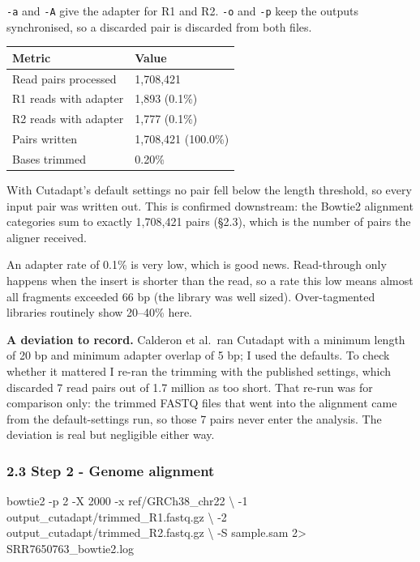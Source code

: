 \documentclass[
  11pt,
  a4paper,
]{article}
\newenvironment{Shaded}{}{}
\newcommand{\AttributeTok}[1]{\textcolor[rgb]{0.49,0.56,0.16}{#1}}
\newcommand{\DataTypeTok}[1]{\textcolor[rgb]{0.56,0.13,0.00}{#1}}
\newcommand{\DecValTok}[1]{\textcolor[rgb]{0.25,0.63,0.44}{#1}}
\newcommand{\ExtensionTok}[1]{#1}
\newcommand{\NormalTok}[1]{#1}
\newcommand{\OperatorTok}[1]{\textcolor[rgb]{0.40,0.40,0.40}{#1}}
\begin{document}
\texttt{-a} and \texttt{-A} give the adapter for R1 and R2. \texttt{-o}
and \texttt{-p} keep the outputs synchronised, so a discarded pair is
discarded from both files.

\begin{longtable}[]{@{}ll@{}}
\toprule\noalign{}
Metric & Value \\
\midrule\noalign{}
\endhead
\bottomrule\noalign{}
\endlastfoot
Read pairs processed & 1,708,421 \\
R1 reads with adapter & 1,893 (0.1\%) \\
R2 reads with adapter & 1,777 (0.1\%) \\
Pairs written & 1,708,421 (100.0\%) \\
Bases trimmed & 0.20\% \\
\end{longtable}

With Cutadapt's default settings no pair fell below the length
threshold, so every input pair was written out. This is confirmed
downstream: the Bowtie2 alignment categories sum to exactly 1,708,421
pairs (§2.3), which is the number of pairs the aligner received.

An adapter rate of 0.1\% is very low, which is good news. Read-through
only happens when the insert is shorter than the read, so a rate this
low means almost all fragments exceeded 66 bp (the library was well
sized). Over-tagmented libraries routinely show 20--40\% here.

\textbf{A deviation to record.} Calderon et al.~ran Cutadapt with a
minimum length of 20 bp and minimum adapter overlap of 5 bp; I used the
defaults. To check whether it mattered I re-ran the trimming with the
published settings, which discarded 7 read pairs out of 1.7 million as
too short. That re-run was for comparison only: the trimmed FASTQ files
that went into the alignment came from the default-settings run, so
those 7 pairs never enter the analysis. The deviation is real but
negligible either way.

\hypertarget{step-2---genome-alignment}{%
\subsubsection{2.3 Step 2 - Genome
alignment}\label{step-2---genome-alignment}}

\begin{Shaded}
\begin{Highlighting}[]
\ExtensionTok{bowtie2} \AttributeTok{{-}p}\NormalTok{ 2 }\AttributeTok{{-}X}\NormalTok{ 2000 }\AttributeTok{{-}x}\NormalTok{ ref/GRCh38\_chr22 }\DataTypeTok{\textbackslash{}}
  \AttributeTok{{-}1}\NormalTok{ output\_cutadapt/trimmed\_R1.fastq.gz }\DataTypeTok{\textbackslash{}}
  \AttributeTok{{-}2}\NormalTok{ output\_cutadapt/trimmed\_R2.fastq.gz }\DataTypeTok{\textbackslash{}}
  \AttributeTok{{-}S}\NormalTok{ sample.sam }\DecValTok{2}\OperatorTok{\textgreater{}}\NormalTok{ SRR7650763\_bowtie2.log}
\end{Highlighting}
\end{Shaded}
\end{document}
